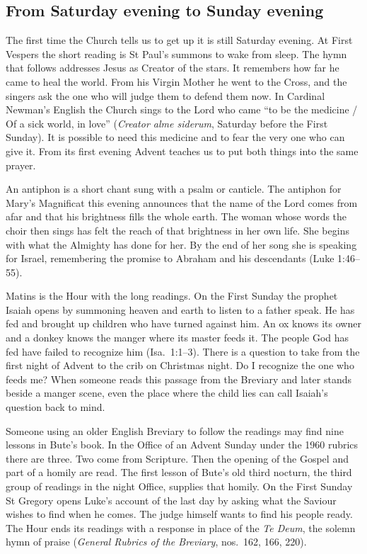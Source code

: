 \subsection{From Saturday evening to Sunday evening}

The first time the Church tells us to get up it is still Saturday
evening. At First Vespers the short reading is St Paul's summons to
wake from sleep. The hymn that follows addresses Jesus as Creator of
the stars. It remembers how far he came to heal the world. From his
Virgin Mother he went to the Cross, and the singers ask the one who
will judge them to defend them now. In Cardinal Newman's English the
Church sings to the Lord who came “to be the medicine / Of a sick
world, in love”
(\emph{Creator alme siderum}, Saturday before the First Sunday).
It is possible to need this medicine and to fear the very one who can
give it. From its first evening Advent teaches us to put both things
into the same prayer.

An antiphon is a short chant sung with a psalm or canticle. The
antiphon for Mary's Magnificat this evening announces that the name of
the Lord comes from afar and that his brightness fills the whole
earth. The woman whose words the choir then sings has felt the reach
of that brightness in her own life. She begins with what the Almighty
has done for her. By the end of her song she is speaking for Israel,
remembering the promise to Abraham and his descendants (Luke
1:46--55).

Matins is the Hour with the long readings. On the First Sunday the
prophet Isaiah opens by summoning heaven and earth to listen to a
father speak. He has fed and brought up children who have turned
against him. An ox knows its owner and a donkey knows the manger
where its master feeds it. The people God has fed have failed to
recognize him (Isa.~1:1--3). There is a question to take from the
first night of Advent to the crib on Christmas night. Do I recognize
the one who feeds me? When someone reads this passage from the
Breviary and later stands beside a manger scene, even the place
where the child lies can call Isaiah's question back to mind.

Someone using an older English Breviary to follow the readings may
find nine lessons in Bute's book. In the Office of an Advent Sunday
under the 1960 rubrics there are three. Two come from Scripture.
Then the opening of the Gospel and part of a homily are read.
The first lesson of Bute's old third nocturn, the third group of
readings in the night Office, supplies that homily. On the First
Sunday St Gregory opens Luke's account of the last day by asking
what the Saviour wishes to find when he comes. The judge himself
wants to find his people ready. The Hour ends its readings with a
response in place of the \emph{Te Deum}, the solemn hymn of praise
(\emph{General Rubrics of the Breviary}, nos.~162, 166, 220).

